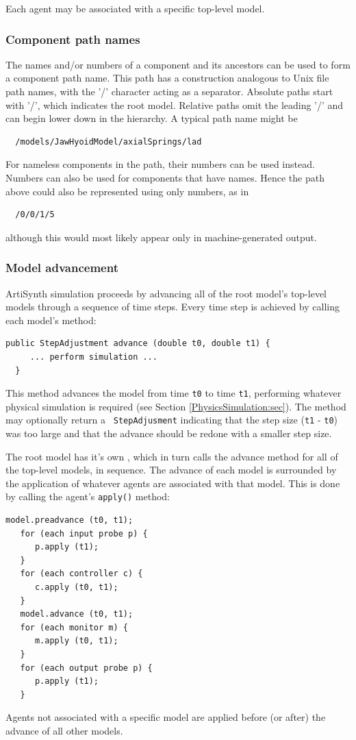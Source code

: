 Each agent may be associated with a specific top-level model.

\subsubsection{Component path names}
\label{PathNames:sec}

The names and/or numbers of a component and its ancestors can be used to
form a component path name. This path has a construction 
analogous to Unix file path names, with the '/' character acting as a
separator. Absolute paths start with '/', which indicates the root
model. Relative paths omit the leading '/' and can begin lower down
in the hierarchy. A typical path name might be
\begin{verbatim}
  /models/JawHyoidModel/axialSprings/lad
\end{verbatim}
For nameless components in the path, their numbers can be used
instead.  Numbers can also be used for components that have
names. Hence the path above could also be represented using
only numbers, as in
\begin{verbatim}
  /0/0/1/5
\end{verbatim}
although this would most likely appear only in machine-generated
output.

\subsubsection{Model advancement}
\label{ModelAdvancement:sec}

ArtiSynth simulation proceeds by advancing all of the root model's
top-level models through a sequence of time steps. Every time
step is achieved by calling each model's 
 method:
\begin{lstlisting}[]
  public StepAdjustment advance (double t0, double t1) {
     ... perform simulation ...
  }
\end{lstlisting}
This method advances the model from time {\tt t0} to time {\tt t1},
performing whatever physical simulation is required (see Section
\ref{PhysicsSimulation:sec}). The method may optionally return a {\tt
StepAdjusment} indicating that the step size ({\tt t1} - {\tt t0}) was
too large and that the advance should be redone with a smaller step
size. 

The root model has it's own
, which in
turn calls the advance method for all of the top-level models, in
sequence. The advance of each model is surrounded by the application
of whatever 
agents are associated with that model. This is done
by calling the agent's {\tt apply()} method:
\begin{lstlisting}[]
   model.preadvance (t0, t1);
   for (each input probe p) {
      p.apply (t1);
   }
   for (each controller c) {
      c.apply (t0, t1);
   }
   model.advance (t0, t1);
   for (each monitor m) {
      m.apply (t0, t1);
   }
   for (each output probe p) {
      p.apply (t1);
   }
\end{lstlisting}
Agents not associated with a specific model are applied before (or
after) the advance of all other models.

